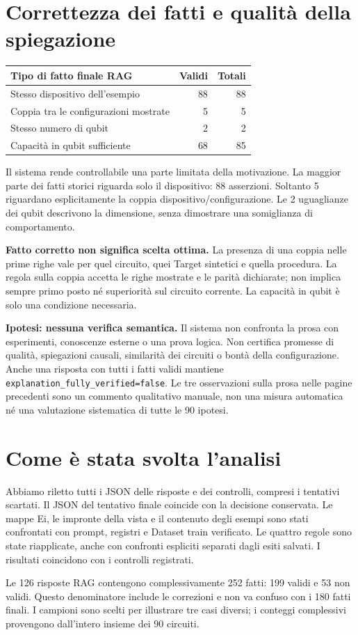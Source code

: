 \documentclass[a4paper,10pt]{article}
\begin{document}
\section*{Correttezza dei fatti e qualità della spiegazione}
\begin{tabularx}{\linewidth}{Xrr}\toprule Tipo di fatto finale RAG & Validi & Totali\\\midrule
Stesso dispositivo dell'esempio & 88 & 88\\
Coppia tra le configurazioni mostrate & 5 & 5\\
Stesso numero di qubit & 2 & 2\\
Capacità in qubit sufficiente & 68 & 85\\
\bottomrule\end{tabularx}\par
Il sistema rende controllabile una parte limitata della motivazione. La maggior parte dei fatti storici riguarda solo il dispositivo: 88 asserzioni. Soltanto 5 riguardano esplicitamente la coppia dispositivo/configurazione. Le 2 uguaglianze dei qubit descrivono la dimensione, senza dimostrare una somiglianza di comportamento.\par
\textbf{Fatto corretto non significa scelta ottima.} La presenza di una coppia nelle prime righe vale per quel circuito, quei Target sintetici e quella procedura. La regola sulla coppia accetta le righe mostrate e le parità dichiarate; non implica sempre primo posto né superiorità sul circuito corrente. La capacità in qubit è solo una condizione necessaria.\par
\textbf{Ipotesi: nessuna verifica semantica.} Il sistema non confronta la prosa con esperimenti, conoscenze esterne o una prova logica. Non certifica promesse di qualità, spiegazioni causali, similarità dei circuiti o bontà della configurazione. Anche una risposta con tutti i fatti validi mantiene \texttt{explanation\_fully\_verified=false}. Le tre osservazioni sulla prosa nelle pagine precedenti sono un commento qualitativo manuale, non una misura automatica né una valutazione sistematica di tutte le 90 ipotesi.\par
\section*{Come è stata svolta l'analisi}
Abbiamo riletto tutti i JSON delle risposte e dei controlli, compresi i tentativi scartati. Il JSON del tentativo finale coincide con la decisione conservata. Le mappe Ei, le impronte della vista e il contenuto degli esempi sono stati confrontati con prompt, registri e Dataset train verificato. Le quattro regole sono state riapplicate, anche con confronti espliciti separati dagli esiti salvati. I risultati coincidono con i controlli registrati.\par
Le 126 risposte RAG contengono complessivamente 252 fatti: 199 validi e 53 non validi. Questo denominatore include le correzioni e non va confuso con i 180 fatti finali. I campioni sono scelti per illustrare tre casi diversi; i conteggi complessivi provengono dall'intero insieme dei 90 circuiti.\par
\end{document}
